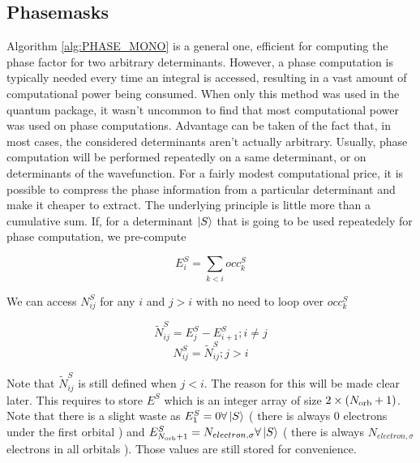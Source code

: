 \documentclass[./thesis.tex]{subfiles}
\begin{document}
\subsection{Phasemasks}


Algorithm \ref{alg:PHASE_MONO} is a general one, efficient for computing the phase factor for two arbitrary determinants. However, a phase computation is typically needed every time an integral is accessed, resulting in a vast amount of computational power being consumed. When only this method was used in the quantum package, it wasn't uncommon to find that most computational power was used on phase computations.
Advantage can be taken of the fact that, in most cases, the considered determinants aren't actually arbitrary. Usually, phase computation will be performed repeatedly on a same determinant, or on determinants of the wavefunction. For a fairly modest computational price, it is possible to compress the phase information from a particular determinant and make it cheaper to extract. The underlying principle is little more than a cumulative sum. If, for a determinant $\ket S$ that is going to be used repeatedely for phase computation, we pre-compute
        
$$E^S_{i} = \sum_{k < i} occ^{S}_{k}$$
        
We can access $N^S_{ij}$ for any $i$ and $j>i$ with no need to loop over $occ^{S}_{k}$

$$\tilde N^S_{ij} = E^S_j - E^S_{i+1} ; i \neq j$$
$$N^S_{ij} = \tilde N^S_{ij} ; j>i$$

Note that $\tilde N^S_{ij}$ is still defined when $j<i$. The reason for this will be made clear later.
This requires to store $E^S$ which is an integer array of size $2 \times ({N_\text{orb}}+1)$. Note that there is a slight waste as $E^S_1 = 0 \forall \ket S$ ( there is always $0$ electrons under the first orbital ) and $E^S_{{N_\text{orb}}+1} = N_{electron,\sigma} \forall \ket S$ ( there is always $N_{electron,\sigma}$ electrons in all orbitals ). Those values are still stored for convenience.

\end{document}

